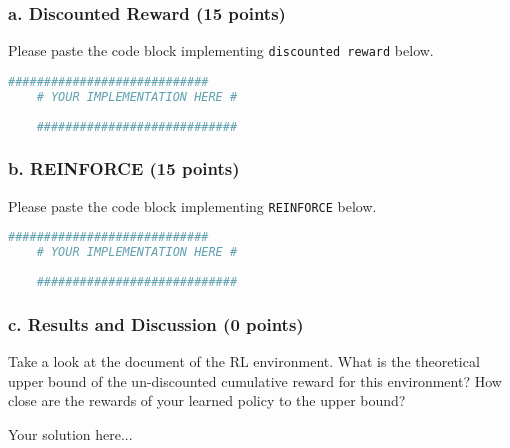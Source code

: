 \documentclass[12pt]{article}
\begin{document}
\subsubsection*{a. Discounted Reward (15 points)}
Please paste the code block implementing \texttt{discounted reward} below. 
            \begin{solution}
                \begin{lstlisting}[language=Python]
    ############################
    # YOUR IMPLEMENTATION HERE #
    
    ############################
                \end{lstlisting}
            \end{solution}


\subsubsection*{b. REINFORCE (15 points)}
Please paste the code block implementing \texttt{REINFORCE} below. 
            \begin{solution}
                \begin{lstlisting}[language=Python]
    ############################
    # YOUR IMPLEMENTATION HERE #
    
    ############################
                \end{lstlisting}
            \end{solution}

\subsubsection*{c. Results and Discussion (0 points)}
Take a look at the document of the RL environment. What is the theoretical upper bound of the un-discounted cumulative reward for this environment? How close are the rewards of your learned policy to the upper bound?
\begin{solution}
    Your solution here...
\end{solution}
\end{document}
